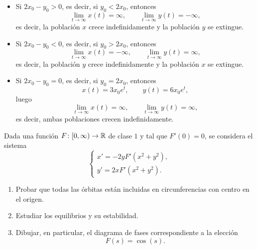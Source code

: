 \documentclass[11pt]{report}
\begin{document}
\begin{solution}
\begin{enumerate}
        \begin{itemize}
            \item Si $2x_0-y_0 > 0$, es decir, si $y_0 < 2x_0$, entonces
            \[\lim_{t\to\infty}x(t) = \infty, \qquad \lim_{t\to\infty}y(t) = -\infty,\]
            es decir, la población $x$ crece indefinidamente y la población $y$ se extingue.
            \item Si $2x_0-y_0 < 0$, es decir, si $y_0 > 2x_0$, entonces
            \[\lim_{t\to\infty}x(t) = -\infty, \qquad \lim_{t\to\infty}y(t) = \infty,\]
            es decir, la población $y$ crece indefinidamente y la población $x$ se extingue.
            \item Si $2x_0-y_0 = 0$, es decir, si $y_0 = 2x_0$, entonces
            \[x(t)=3x_0e^t, \qquad y(t) = 6x_0e^t,\]
            luego
            \[\lim_{t\to\infty}x(t) = \infty, \qquad \lim_{t\to\infty}y(t) = \infty,\]
            es decir, ambas poblaciones crecen indefinidamente.
        \end{itemize}
    \end{enumerate} 
\end{solution}

\begin{exercise}
    Dada una función $F \colon [0,\infty) \to \mathbb R$ de clase $1$ y tal que $F'(0)=0$, se considera el sistema
    \[\begin{cases}
        x' = -2yF'(x^2+y^2), \\
        y' = 2xF'(x^2+y^2).
    \end{cases}\] 
    \begin{enumerate}
        \item Probar que todas las órbitas están incluidas en circunferencias con centro en el origen.
        \item Estudiar los equilibrios y su estabilidad.
        \item Dibujar, en particular, el diagrama de fases correspondiente a la elección
        \[F(s) = \cos(s).\]
    \end{enumerate}
\end{exercise}
\end{document}
